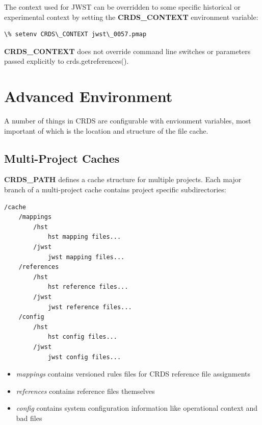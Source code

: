 \documentclass[letterpaper,10pt,english]{sphinxmanual}
\begin{document}
The context used for JWST can be overridden to some specific historical or experimental context by setting
the \textbf{CRDS\_CONTEXT} environment variable:

\begin{Verbatim}[commandchars=\\\{\}]
\% setenv CRDS\_CONTEXT jwst\_0057.pmap
\end{Verbatim}

\textbf{CRDS\_CONTEXT} does not override command line switches or parameters passed explicitly to crds.getreferences().


\section{Advanced Environment}
\label{installation:advanced-environment}
A number of things in CRDS are configurable with envionment variables,  most important of which is the
location and structure of the file cache.


\subsection{Multi-Project Caches}
\label{installation:multi-project-caches}
\textbf{CRDS\_PATH} defines a cache structure for multiple projects. Each major branch of a multi-project cache
contains project specific subdirectories:

\begin{Verbatim}[commandchars=\\\{\}]
/cache
    /mappings
        /hst
            hst mapping files...
        /jwst
            jwst mapping files...
    /references
        /hst
            hst reference files...
        /jwst
            jwst reference files...
    /config
        /hst
            hst config files...
        /jwst
            jwst config files...
\end{Verbatim}
\begin{itemize}
\item {} 
\emph{mappings} contains versioned rules files for CRDS reference file assignments

\item {} 
\emph{references} contains reference files themselves

\item {} 
\emph{config} contains system configuration information like operational context and bad files

\end{itemize}
\end{document}
